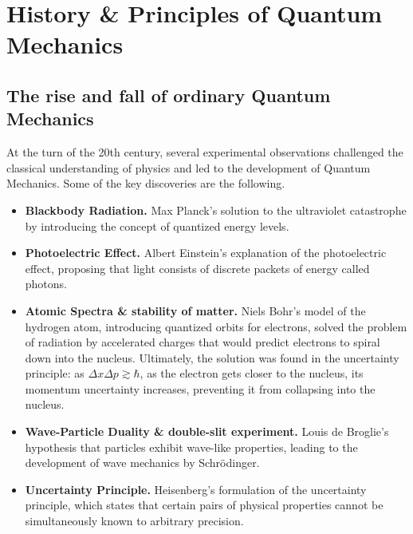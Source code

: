 \documentclass[../QFT_main.tex]{subfiles}
\begin{document}
\chapter{History \& Principles of Quantum Mechanics}


\section{The rise and fall of ordinary Quantum Mechanics} 


\begin{mytheorem}
At the turn of the 20th century, several experimental observations challenged the classical understanding of physics and led to the development of Quantum Mechanics.
Some of the key discoveries are the following.
\begin{itemize}
    \item \textbf{Blackbody Radiation.} Max Planck's solution to the ultraviolet catastrophe by introducing the concept of quantized energy levels.
    \item \textbf{Photoelectric Effect.} Albert Einstein's explanation of the photoelectric effect, proposing that light consists of discrete packets of energy called photons.
    \item \textbf{Atomic Spectra \& stability of matter.} Niels Bohr's model of the hydrogen atom, introducing quantized orbits for electrons, solved the problem of radiation by accelerated charges that would predict electrons to spiral down into the nucleus.
    Ultimately, the solution was found in the uncertainty principle: as $\Delta x \Delta p \gtrsim \hbar$, as the electron gets closer to the nucleus, its momentum uncertainty increases, preventing it from collapsing into the nucleus.
    \item \textbf{Wave-Particle Duality \& double-slit experiment.} Louis de Broglie's hypothesis that particles exhibit wave-like properties, leading to the development of wave mechanics by Schrödinger.
    \item \textbf{Uncertainty Principle.} Heisenberg's formulation of the uncertainty principle, which states that certain pairs of physical properties cannot be simultaneously known to arbitrary precision.
\end{itemize}
\end{mytheorem}
\end{document}
